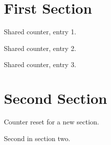 \documentclass{didactic}
\begin{document}
\section{First Section}
\begin{theorem}    Shared counter, entry 1.  \end{theorem}   %
\begin{definition} Shared counter, entry 2.  \end{definition}%
\begin{lemma}      Shared counter, entry 3.  \end{lemma}     %

\section{Second Section}
\begin{theorem}    Counter reset for a new section. \end{theorem}   %
\begin{definition} Second in section two.          \end{definition}%
\end{document}
